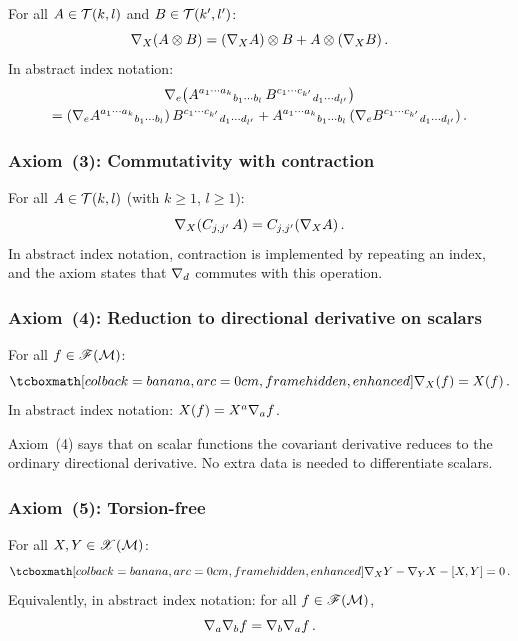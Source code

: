 For all $A\in\mathcal{T}(k,l)$ and $B\in\mathcal{T}(k',l')$:
\begin{equation}\label{eq:axiom2}
  \nabla_X(A\otimes B) = (\nabla_X A)\otimes B + A\otimes(\nabla_X B)\,.
\end{equation}
In abstract index notation:
\begin{multline}\label{eq:axiom2-ain}
  \nabla_e\bigl(
    A^{a_1\cdots a_k}{}_{b_1\cdots b_l}\,
    B^{c_1\cdots c_{k'}}{}_{d_1\cdots d_{l'}}
  \bigr) \\
  = (\nabla_e A^{a_1\cdots a_k}{}_{b_1\cdots b_l})\,
    B^{c_1\cdots c_{k'}}{}_{d_1\cdots d_{l'}}
  + A^{a_1\cdots a_k}{}_{b_1\cdots b_l}\,
    (\nabla_e B^{c_1\cdots c_{k'}}{}_{d_1\cdots d_{l'}})\,.
\end{multline}

\subsubsection*{Axiom~(3): Commutativity with contraction}

For all $A\in\mathcal{T}(k,l)$ (with $k\geq 1$, $l\geq 1$):
\begin{equation}\label{eq:axiom3}
  \nabla_X(C_{j,j'}\, A) = C_{j,j'}(\nabla_X A)\,.
\end{equation}
In abstract index notation, contraction is implemented by
repeating an index, and the axiom states that $\nabla_d$
commutes with this operation.

\subsubsection*{Axiom~(4): Reduction to directional derivative
on scalars}

For all $f\in\mathscr{F}(\mathcal{M})$:
\begin{equation}\label{eq:axiom4}
  \eqbox{\covd_X(f) = X(f)}\,.
\end{equation}
In abstract index notation: $X(f) = X^a\nabla_a f$.

\begin{remark}
  Axiom~(4) says that on scalar functions the covariant
  derivative reduces to the ordinary directional derivative.
  No extra data is needed to differentiate scalars.
\end{remark}

\subsubsection*{Axiom~(5): Torsion-free}

For all $X,Y\in\mathscr{X}(\mathcal{M})$:
\begin{equation}\label{eq:axiom5-torsionfree}
  \eqbox{\covd_X Y - \covd_Y X - [X,Y] = 0}\,.
\end{equation}
Equivalently, in abstract index notation: for all
$f\in\mathscr{F}(\mathcal{M})$,
\begin{equation}\label{eq:torsion-free-ain}
  \nabla_a\nabla_b f = \nabla_b\nabla_a f\,.
\end{equation}


